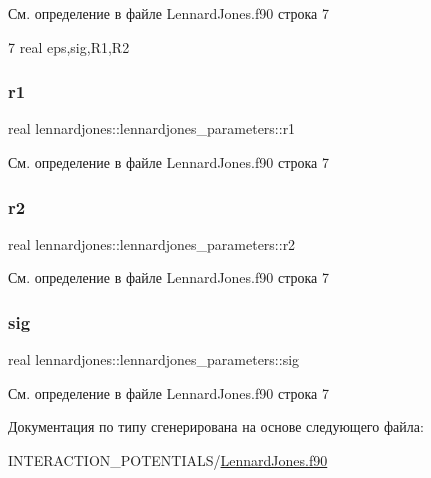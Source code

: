 См. определение в файле Lennard\+Jones.\+f90 строка 7


\begin{DoxyCode}
7     \textcolor{keywordtype}{real} eps,sig,R1,R2
\end{DoxyCode}
\mbox{\label{structlennardjones_1_1lennardjones__parameters_a1950c8901fc88cb41fa23dc1edd040a8}} 
\subsubsection{\texorpdfstring{r1}{r1}}
{\footnotesize\ttfamily real lennardjones\+::lennardjones\+\_\+parameters\+::r1}



См. определение в файле Lennard\+Jones.\+f90 строка 7

\mbox{\label{structlennardjones_1_1lennardjones__parameters_abc2498c7e76afc7a60d66ce09d4acdea}} 
\subsubsection{\texorpdfstring{r2}{r2}}
{\footnotesize\ttfamily real lennardjones\+::lennardjones\+\_\+parameters\+::r2}



См. определение в файле Lennard\+Jones.\+f90 строка 7

\mbox{\label{structlennardjones_1_1lennardjones__parameters_a006bd17e43dab4f8df5d45086b838bc8}} 
\subsubsection{\texorpdfstring{sig}{sig}}
{\footnotesize\ttfamily real lennardjones\+::lennardjones\+\_\+parameters\+::sig}



См. определение в файле Lennard\+Jones.\+f90 строка 7



Документация по типу сгенерирована на основе следующего файла\+:\begin{DoxyCompactItemize}
\item 
I\+N\+T\+E\+R\+A\+C\+T\+I\+O\+N\+\_\+\+P\+O\+T\+E\+N\+T\+I\+A\+L\+S/\mbox{\hyperlink{_lennard_jones_8f90}{Lennard\+Jones.\+f90}}\end{DoxyCompactItemize}
